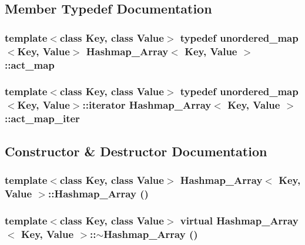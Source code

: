 \subsection{Member Typedef Documentation}
\hypertarget{class_hashmap___array_adaad9865d64cbb9488e925a530c03786}{
\subsubsection[{act\_\-map}]{\setlength{\rightskip}{0pt plus 5cm}template$<$class Key, class Value$>$ typedef unordered\_\-map$<$Key, Value$>$ {\bf Hashmap\_\-Array}$<$ Key, Value $>$::{\bf act\_\-map}}}
\label{class_hashmap___array_adaad9865d64cbb9488e925a530c03786}
\hypertarget{class_hashmap___array_a0aaeec502621b4c78da9115c26797a64}{
\subsubsection[{act\_\-map\_\-iter}]{\setlength{\rightskip}{0pt plus 5cm}template$<$class Key, class Value$>$ typedef unordered\_\-map$<$Key, Value$>$::{\bf iterator} {\bf Hashmap\_\-Array}$<$ Key, Value $>$::{\bf act\_\-map\_\-iter}}}
\label{class_hashmap___array_a0aaeec502621b4c78da9115c26797a64}


\subsection{Constructor \& Destructor Documentation}
\hypertarget{class_hashmap___array_aa3f0961bafd3303fce6f490a5b2cac63}{
\subsubsection[{Hashmap\_\-Array}]{\setlength{\rightskip}{0pt plus 5cm}template$<$class Key, class Value$>$ {\bf Hashmap\_\-Array}$<$ Key, Value $>$::{\bf Hashmap\_\-Array} ()}}
\label{class_hashmap___array_aa3f0961bafd3303fce6f490a5b2cac63}
\hypertarget{class_hashmap___array_aec77a7e86dcbe2ace59b2d8949e9e4ab}{
\subsubsection[{$\sim$Hashmap\_\-Array}]{\setlength{\rightskip}{0pt plus 5cm}template$<$class Key, class Value$>$ virtual {\bf Hashmap\_\-Array}$<$ Key, Value $>$::$\sim${\bf Hashmap\_\-Array} ()}}
\label{class_hashmap___array_aec77a7e86dcbe2ace59b2d8949e9e4ab}


